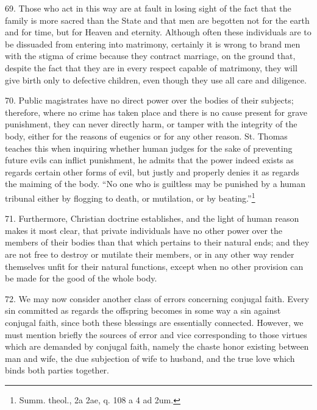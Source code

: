 \documentclass[12pt,a4paper]{book}
\begin{document}
69. Those who act in this way are at fault in losing sight of the fact that the family is more sacred than the State and that men are begotten not for the earth and for time, but for Heaven and eternity. Although often these individuals are to be dissuaded from entering into matrimony, certainly it is wrong to brand men with the stigma of crime because they contract marriage, on the ground that, despite the fact that they are in every respect capable of matrimony, they will give birth only to defective children, even though they use all care and diligence.

70. Public magistrates have no direct power over the bodies of their subjects; therefore, where no crime has taken place and there is no cause present for grave punishment, they can never directly harm, or tamper with the integrity of the body, either for the reasons of eugenics or for any other reason. St. Thomas teaches this when inquiring whether human judges for the sake of preventing future evils can inflict punishment, he admits that the power indeed exists as regards certain other forms of evil, but justly and properly denies it as regards the maiming of the body. ``No one who is guiltless may be punished by a human tribunal either by flogging to death, or mutilation, or by beating.''\footnote{Summ. theol., 2a 2ae, q. 108 a 4 ad 2um.}

71. Furthermore, Christian doctrine establishes, and the light of human reason makes it most clear, that private individuals have no other power over the members of their bodies than that which pertains to their natural ends; and they are not free to destroy or mutilate their members, or in any other way render themselves unfit for their natural functions, except when no other provision can be made for the good of the whole body.

72. We may now consider another class of errors concerning conjugal faith. Every sin committed as regards the offspring becomes in some way a sin against conjugal faith, since both these blessings are essentially connected. However, we must mention briefly the sources of error and vice corresponding to those virtues which are demanded by conjugal faith, namely the chaste honor existing between man and wife, the due subjection of wife to husband, and the true love which binds both parties together.
\end{document}
